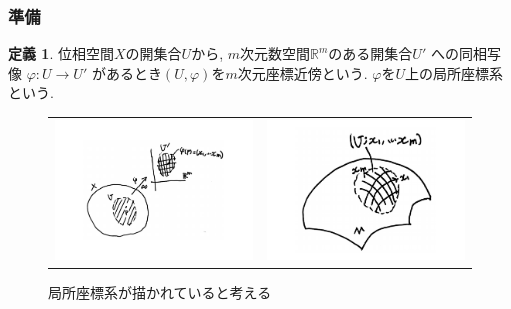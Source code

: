 \documentclass[dvipdfmx,cjk]{beamer}
\theoremstyle{definition}
\newtheorem{dfn}{\textbf{ 定義 }}
\begin{document}
\begin{frame}
\frametitle{準備} 
\begin{dfn}
位相空間$X$の開集合$U$から, $m$次元数空間$\mathbb{R}^m$のある開集合$U'$
への同相写像
$\varphi : U\rightarrow U'$
があるとき$(U, \varphi)$を$m$次元座標近傍という. 
$\varphi$を$U$上の局所座標系という.
\end{dfn}
\begin{figure}[H]
  \begin{tabular}{cc}
    \begin{minipage}[t]{0.45\hsize}
      \centering
      \includegraphics[keepaspectratio, scale=0.2]{coNeighborhoodBig.pdf}
      \caption{$U$上の局所座標系}
      \label{}
    \end{minipage} &
    \begin{minipage}[t]{0.45\hsize}
      \centering
      \includegraphics[keepaspectratio, scale=0.2]{DrawnLocalCoSysBig.pdf}
      \caption{局所座標系が描かれていると考える}
      \label{}
    \end{minipage}
  \end{tabular}
\end{figure}
\end{frame}
\end{document}
